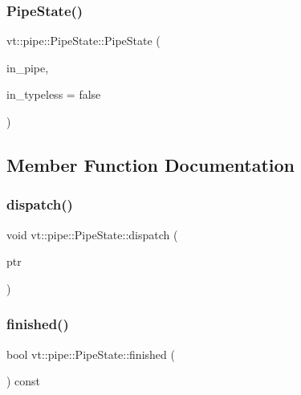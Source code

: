 \mbox{\label{structvt_1_1pipe_1_1_pipe_state_a2f6a2a7f657b0938d0214fc16b65969c}} 
\subsubsection{\texorpdfstring{Pipe\+State()}{PipeState()}\hspace{0.1cm}{\footnotesize\ttfamily [2/2]}}
{\footnotesize\ttfamily vt\+::pipe\+::\+Pipe\+State\+::\+Pipe\+State (\begin{DoxyParamCaption}\item[{\hyperlink{namespacevt_ac9852acda74d1896f48f406cd72c7bd3}{Pipe\+Type} const \&}]{in\+\_\+pipe,  }\item[{bool const \&}]{in\+\_\+typeless = {\ttfamily false} }\end{DoxyParamCaption})}



\subsection{Member Function Documentation}
\mbox{\label{structvt_1_1pipe_1_1_pipe_state_a1e2aea22713ea6b745323f6b3f82b6ed}} 
\subsubsection{\texorpdfstring{dispatch()}{dispatch()}}
{\footnotesize\ttfamily void vt\+::pipe\+::\+Pipe\+State\+::dispatch (\begin{DoxyParamCaption}\item[{void $\ast$}]{ptr }\end{DoxyParamCaption})}

\mbox{\label{structvt_1_1pipe_1_1_pipe_state_a593b2ce5b04ce3e4234654f454868434}} 
\subsubsection{\texorpdfstring{finished()}{finished()}}
{\footnotesize\ttfamily bool vt\+::pipe\+::\+Pipe\+State\+::finished (\begin{DoxyParamCaption}{ }\end{DoxyParamCaption}) const}

